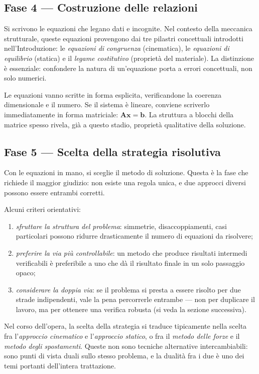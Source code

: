 \subsection*{Fase 4 --- Costruzione delle relazioni}

Si scrivono le equazioni che legano dati e incognite. Nel contesto della meccanica strutturale, queste equazioni provengono dai tre pilastri concettuali introdotti nell'Introduzione: le \textit{equazioni di congruenza} (cinematica), le \textit{equazioni di equilibrio} (statica) e il \textit{legame costitutivo} (proprietà del materiale). La distinzione è essenziale: confondere la natura di un'equazione porta a errori concettuali, non solo numerici.

Le equazioni vanno scritte in forma esplicita, verificandone la coerenza dimensionale e il numero. Se il sistema è lineare, conviene scriverlo immediatamente in forma matriciale: $\bm{A}\bm{x} = \bm{b}$. La struttura a blocchi della matrice spesso rivela, già a questo stadio, proprietà qualitative della soluzione.


\subsection*{Fase 5 --- Scelta della strategia risolutiva}

Con le equazioni in mano, si sceglie il metodo di soluzione. Questa è la fase che richiede il maggior giudizio: non esiste una regola unica, e due approcci diversi possono essere entrambi corretti.

Alcuni criteri orientativi:

\begin{enumerate}[label=(\alph*)]
	\item \textit{sfruttare la struttura del problema}: simmetrie, disaccoppiamenti, casi particolari possono ridurre drasticamente il numero di equazioni da risolvere;
	\item \textit{preferire la via più controllabile}: un metodo che produce risultati intermedi verificabili è preferibile a uno che dà il risultato finale in un solo passaggio opaco;
	\item \textit{considerare la doppia via}: se il problema si presta a essere risolto per due strade indipendenti, vale la pena percorrerle entrambe --- non per duplicare il lavoro, ma per ottenere una verifica robusta (si veda la sezione successiva).
\end{enumerate}

Nel corso dell'opera, la scelta della strategia si traduce tipicamente nella scelta fra l'\textit{approccio cinematico} e l'\textit{approccio statico}, o fra il \textit{metodo delle forze} e il \textit{metodo degli spostamenti}. Queste non sono tecniche alternative intercambiabili: sono punti di vista duali sullo stesso problema, e la dualità fra i due è uno dei temi portanti dell'intera trattazione.

